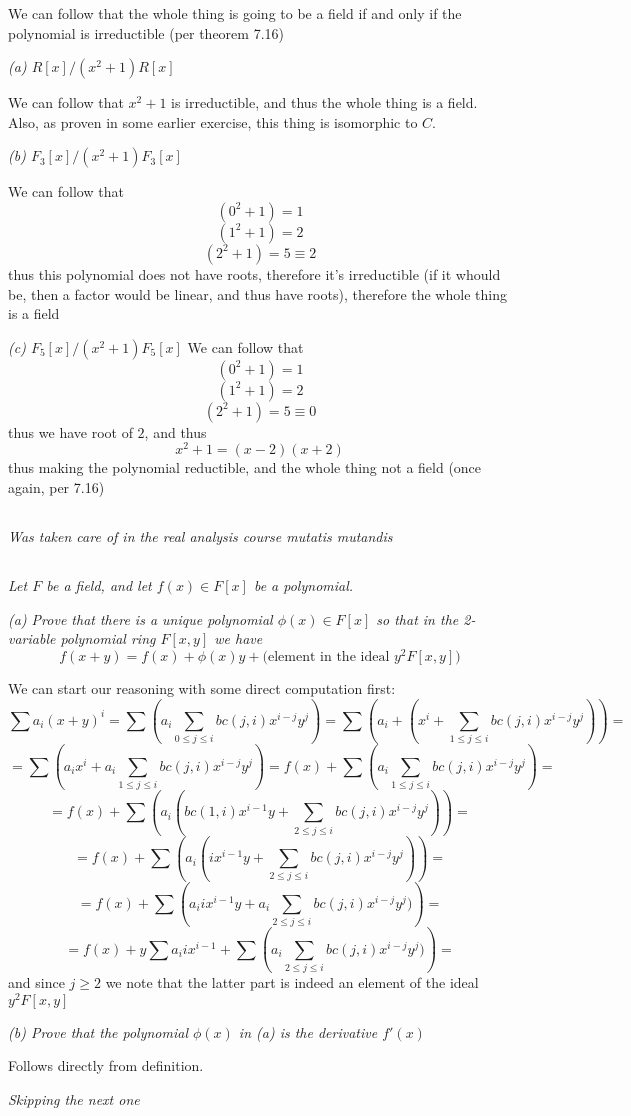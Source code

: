 \documentclass[11pt,oneside,titlepage]{book}
\begin{document}
We can follow that the whole thing is going to be a field
if and only if the polynomial is irreductible (per theorem 7.16)

\textit{(a) $R[x]/(x^2 + 1)R[x]$}

We can follow that $x^2 + 1$ is irreductible, and thus the whole thing is a
field. Also, as proven in some earlier exercise, this thing is isomorphic
to $C$.

\textit{(b) $F_3[x]/(x^2 + 1)F_3[x]$}

We can follow that
$$(0^2 + 1)  = 1$$
$$(1^2 + 1)  = 2$$
$$(2^2 + 1)  = 5 \equiv 2$$
thus this polynomial does not have roots, therefore it's irreductible
(if it whould be, then a factor would be linear, and thus have roots),
therefore the whole thing is a field

\textit{(c) $F_5[x]/(x^2 + 1)F_5[x]$}
We can follow that
$$(0^2 + 1)  = 1$$
$$(1^2 + 1)  = 2$$
$$(2^2 + 1)  = 5 \equiv 0$$
thus we have root of $2$, and thus
$$x^2 + 1 = (x - 2)(x + 2)$$
thus making the polynomial reductible, and the whole thing not a field
(once again, per 7.16)

\subsection{}

\textit{Was taken care of in the real analysis course mutatis mutandis}

\subsection{}

\textit{Let $F$ be a field, and let $f(x) \in F[x]$ be a polynomial.}

\textit{(a) Prove that there is a unique polynomial $\phi(x) \in F[x]$
  so that in the 2-variable polynomial ring $F[x, y]$ we have
  $$f(x + y) = f(x) + \phi(x)y + \text{(element in the ideal $y^2F[x, y]$)}$$
}

We can start our reasoning with some direct computation first:
$$\sum{a_i (x + y)^i} = \sum{\left(a_i \sum_{0 \leq j \leq i}{bc(j, i)x^{i - j}y^j}\right)} =
\sum{\left(a_i + (x^i + \sum_{1 \leq j \leq i}{bc(j, i)x^{i - j}y^j})\right)} = $$
$$= \sum{\left(a_ix^i + a_i\sum_{1 \leq j \leq i}{bc(j, i)x^{i - j}y^j}\right)} =
f(x) + \sum{\left(a_i\sum_{1 \leq j \leq i}{bc(j, i)x^{i - j}y^j}\right)} =$$
$$ = f(x) + \sum{\left(a_i(bc(1, i)x^{i - 1}y +
    \sum_{2 \leq j \leq i}{bc(j, i)x^{i - j}y^j})\right)} = $$
$$ = f(x) + \sum{\left(a_i(i x^{i - 1}y +
    \sum_{2 \leq j \leq i}{bc(j, i)x^{i - j}y^j})\right)} = $$
$$ = f(x) + \sum{\left(a_i i x^{i - 1}y +
    a_i \sum_{2 \leq j \leq i}{bc(j, i)x^{i - j}y^j})\right)} = $$
$$ = f(x) + y \sum{a_i i x^{i - 1}} +
\sum{\left(a_i \sum_{2 \leq j \leq i}{bc(j, i)x^{i - j}y^j})\right)} = $$
and since $j \geq 2$ we note that the latter part is indeed an element of the
ideal $y^2 F[x, y]$

\textit{(b) Prove that the polynomial $\phi(x)$ in (a) is the derivative $f'(x)$}

Follows directly from definition.

\textit{Skipping the next one}
\end{document}
